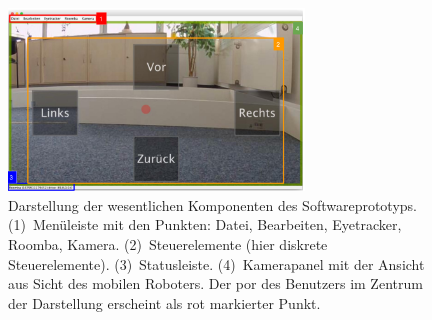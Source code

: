 \begin{figure}[ht]
\begin{center}
\includegraphics[width=0.7\textwidth]{bilder/implementierung/diskretMode1.png}
\end{center}
\caption{Darstellung der wesentlichen Komponenten des Softwareprototyps. (1)~Menüleiste mit den Punkten: Datei, Bearbeiten, Eyetracker, Roomba, Kamera. (2)~Steuerelemente (hier diskrete Steuerelemente). (3)~Statusleiste. (4)~Kamerapanel mit der Ansicht aus Sicht des mobilen Roboters. Der \acs{por} des Benutzers im Zentrum der Darstellung  erscheint als rot markierter Punkt.}
\label{fig:diskretModeKomp}
\end{figure}


